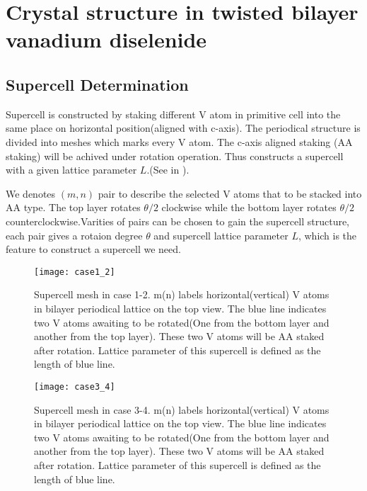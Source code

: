 \setchapterpreamble[u]{\margintoc}
\chapter{Crystal structure in twisted bilayer vanadium diselenide}

\section{Supercell Determination}

Supercell is constructed by staking different V atom in primitive cell into the same place on horizontal position(aligned with c-axis). The periodical structure is divided into meshes which marks every V atom. The c-axis aligned staking (AA staking) will be achived under rotation operation. Thus constructs a supercell with a given lattice parameter $L$.(See in ).

We denotes $(m,n)$  pair to describe the selected V atoms that to be stacked into AA type. The top layer rotates $\theta/2$ clockwise while the bottom layer rotates $\theta/2$ counterclockwise.Varities of pairs can be chosen to gain the supercell structure, each pair gives a rotaion degree $\theta$ and supercell lattice parameter $L$, which is the feature to construct a supercell we need.
\begin{figure}[ht]
	\texttt{[image: case1\_2]}
	\caption[Supercell mesh in case 1-2]{
		Supercell mesh in case 1-2. m(n) labels horizontal(vertical) V atoms in bilayer periodical lattice on the top view. The blue line indicates two V atoms awaiting to be rotated(One from the bottom layer and another from the top layer). These two V atoms will be AA staked after rotation. Lattice parameter of this supercell is defined as the length of blue line.}
\end{figure}

\begin{figure}[ht]
	\texttt{[image: case3\_4]}
	\caption[Supercell mesh in case 3-4]{
		Supercell mesh in case 3-4. m(n) labels horizontal(vertical) V atoms in bilayer periodical lattice on the top view. The blue line indicates two V atoms awaiting to be rotated(One from the bottom layer and another from the top layer). These two V atoms will be AA staked after rotation. Lattice parameter of this supercell is defined as the length of blue line.}
\end{figure}

